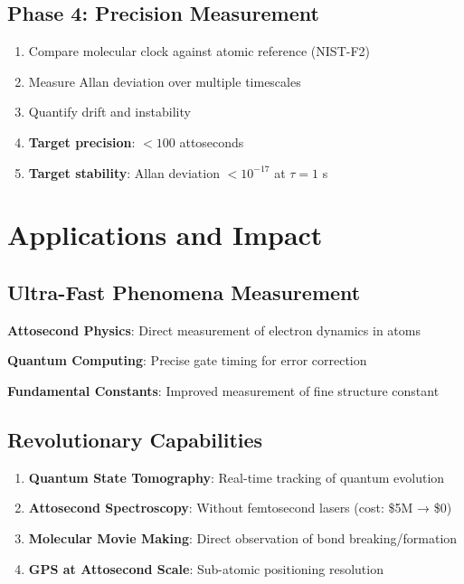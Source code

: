 \documentclass[12pt,a4paper]{article}
\begin{document}
\subsection{Phase 4: Precision Measurement}

\begin{enumerate}
\item Compare molecular clock against atomic reference (NIST-F2)
\item Measure Allan deviation over multiple timescales
\item Quantify drift and instability
\item \textbf{Target precision}: $< 100$ attoseconds
\item \textbf{Target stability}: Allan deviation $< 10^{-17}$ at $\tau = 1$ s
\end{enumerate}

\section{Applications and Impact}

\subsection{Ultra-Fast Phenomena Measurement}

\textbf{Attosecond Physics}: Direct measurement of electron dynamics in atoms

\textbf{Quantum Computing}: Precise gate timing for error correction

\textbf{Fundamental Constants}: Improved measurement of fine structure constant

\subsection{Revolutionary Capabilities}

\begin{enumerate}
\item \textbf{Quantum State Tomography}: Real-time tracking of quantum evolution
\item \textbf{Attosecond Spectroscopy}: Without femtosecond lasers (cost: \$5M → \$0)
\item \textbf{Molecular Movie Making}: Direct observation of bond breaking/formation
\item \textbf{GPS at Attosecond Scale}: Sub-atomic positioning resolution
\end{enumerate}
\end{document}
